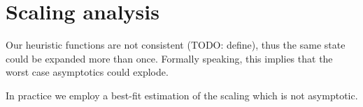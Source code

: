 \section{Scaling analysis}

Our heuristic functions are not consistent (TODO: define), thus the same state
could be expanded more than once. Formally speaking, this implies that the worst
case asymptotics could explode.

In practice we employ a best-fit estimation of the scaling which is not
asymptotic.